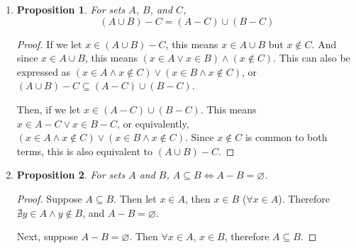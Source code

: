 \documentclass{homework}
\newtheorem*{prop}{Proposition}
\begin{document}
\begin{enumerate}
\begin{minipage}[t]{\linewidth}
\begin{proof}
			However, $3 \in \{3^n : n \in \mathbb{Z}\}$, but $3 \notin \{ 9^n : n \in \mathbb{Z}\}$. Therefore these two sets are not equal. 
			\end{proof}
		\end{minipage}
		
		
		\item \begin{minipage}[t]{\linewidth}
			\begin{prop}
				For sets $A$, $B$, and $C$, \[ \left(A \cup B\right) - C = (A - C) \cup (B- C) \]
			\end{prop}
			\begin{proof} If we let $x \in (A \cup B) - C$, this means $x \in A \cup B$ but $x \notin C$. And since $x \in A \cup B$, this means $(x \in A \vee x \in B) \wedge (x \notin C)$. This can also be expressed as $(x \in A \wedge x \notin C) \vee (x \in B \wedge x \notin C)$, or $\left(A \cup B\right) - C \subseteq (A - C) \cup (B - C)$.
			
			Then, if we let $x \in  (A - C) \cup (B- C)$. This means $x \in A-C \vee x \in B-C$, or equivalently, $(x \in A \wedge x \notin C) \vee (x \in B \wedge x \notin C)$. Since $x \notin C$ is common to both terms, this is also equivalent to $(A \cup B) - C$.
			\end{proof}
		\end{minipage}
	
		\item \begin{minipage}[t]{\linewidth}
			\begin{prop}
				For sets $A$ and $B$, $A \subseteq B \iff A - B = \varnothing$.
			\end{prop}
			\begin{proof} Suppose $A \subseteq B$. Then let $x \in A$, then $x \in B$ ($\forall x \in A$). Therefore $\nexists y \in A \wedge y \notin B$, and $A - B = \varnothing$.
				
				Next, suppose $A - B = \varnothing$. Then $\forall x \in A$, $x \in B$, therefore $A \subseteq B$.
			\end{proof}
		\end{minipage}
	
	\end{enumerate}
\end{document}

